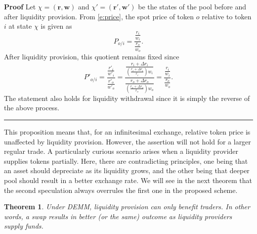 \documentclass[12pt,a4paper]{article}
\newtheorem{theorem}[corollary]{Theorem}
\newcommand{\qed}{\rule{.07in}{.1in}}
\newenvironment{proof}{\vspace{1ex}\noindent\textbf{Proof}\hspace{0.5em}}{\hfill\qed\vspace{1ex}}
\begin{document}
\begin{proof}
Let $\chi=(\mathbf{r},\mathbf{w})$ and $\chi'=(\mathbf{r'},\mathbf{w'})$ be the states of the pool before and after liquidity provision. From \eqref{e:price}, the spot price of token $o$ relative to token $i$ at state $\chi$ is given as
\[P_{o/i}=\frac{\frac{r_i}{w_i}}{\frac{r_o}{w_o}}.\]
After liquidity provision, this quotient remains fixed since
\[P'_{o/i}=\frac{\frac{r'_i}{w'_i}}{\frac{r'_o}{w'_o}}=\frac{\frac{r_i+\Delta r_i}{\left(\frac{r_i+\Delta r_i}{r_i}\right)w_i}}{\frac{r_o+\Delta r_o}{\left(\frac{r_o+\Delta r_o}{r_o}\right)w_o}}=\frac{\frac{r_i}{w_i}}{\frac{r_o}{w_o}}.\]
The statement also holds for liquidity withdrawal since it is simply the reverse of the above process.
\end{proof}

This proposition means that, for an infinitesimal exchange, relative token price is unaffected by liquidity provision. However, the assertion will not hold for a larger regular trade. A particularly curious scenario arises when a liquidity provider supplies tokens partially. Here, there are contradicting principles, one being that an asset should depreciate as its liquidity grows, and the other being that deeper pool should result in a better exchange rate. We will see in the next theorem that the second speculation always overrules the first one in the proposed scheme.

\begin{theorem}\label{t:rate}
Under DEMM, liquidity provision can only benefit traders. In other words, a swap results in better (or the same) outcome as liquidity providers supply funds.
\end{theorem}
\end{document}
